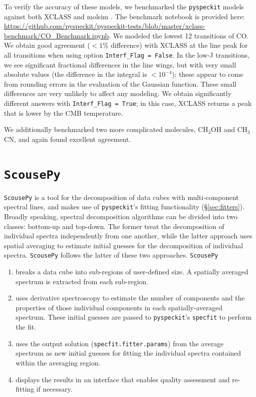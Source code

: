 \documentclass[twocolumn]{aastex63}
\newcommand{\pyspeckit}{\texttt{pyspeckit}\xspace}
\begin{document}
To verify the accuracy of these models, we benchmarked the \pyspeckit models against both XCLASS \citep{Moller2017} and molsim \citep{Lee2021}.
The benchmark notebook is provided here: \url{https://github.com/pyspeckit/pyspeckit-tests/blob/master/xclass-benchmark/CO_Benchmark.ipynb}.
We modeled the lowest 12 transitions of CO.
We obtain good agreement ($<1\%$ difference) with XCLASS at the line peak for all transitions when using option \texttt{Interf\_Flag = False}.
In the low-J transitions, we see significant fractional differences in the line wings, but with very small absolute values (the difference in the integral is $<10^{-4}$); these appear to come from rounding errors in the evaluation of the Gaussian function.
These small differences are very unlikely to affect any modeling.
We obtain significantly different answers with \texttt{Interf\_Flag = True}; in this case, XCLASS returns a peak that is lower by the CMB temperature.

We additionally benchmarked two more complicated molecules, CH$_3$OH and CH$_3$CN, and again found excellent agreement.


\section{\texttt{ScousePy}}
\label{appendix:scouse}

\texttt{ScousePy} is a tool for the decomposition of data cubes with multi-component spectral lines, and makes use of \pyspeckit's fitting functionality (\S \ref{sec:fitters}). Broadly speaking, spectral decomposition algorithms can be divided into two classes: bottom-up and top-down. The former treat the decomposition of individual spectra independently from one another, while the latter approach uses spatial averaging to estimate initial guesses for the decomposition of individual spectra. \texttt{ScousePy} follows the latter of these two approaches.  \texttt{ScousePy}
\begin{enumerate}
    \item 
breaks a data cube into sub-regions of user-defined size.  A spatially averaged spectrum is extracted from each sub-region. 
    \item uses  derivative spectroscopy to estimate the number of components and the properties of those individual components in each spatially-averaged spectrum. These initial guesses are passed to \pyspeckit's \texttt{specfit} to perform the fit. 
    \item uses the output solution (\texttt{specfit.fitter.params}) from the average spectrum as new initial guesses for fitting the individual spectra contained within the averaging region.
    \item displays the results in an interface that enables quality assessment and re-fitting if necessary.
\end{enumerate}
\end{document}
